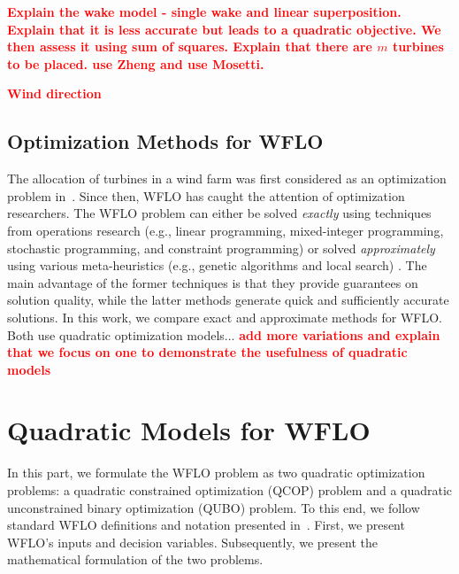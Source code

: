 \documentclass[preprint,12pt]{elsarticle}
\newcommand{\todo}[1]{{\textcolor{red}{\bf {#1}}}}
\begin{document}
\todo{Explain the wake model - single wake and linear superposition. Explain that it is less accurate but leads to a quadratic objective. We then assess it using sum of squares. Explain that there are $m$ turbines to be placed. use Zheng and use Mosetti.}

\todo{Wind direction}

 
\subsection{Optimization Methods for WFLO}

The allocation of turbines in a wind farm was first considered 
as an optimization problem in~\cite{MOSETTI1994105}. Since
then, WFLO has caught the attention of optimization researchers. 
The WFLO problem can either be solved \emph{exactly} using
techniques from operations research (e.g., linear programming, 
mixed-integer programming, stochastic programming, and constraint programming)\cite{Zhang2014,turner2014new}
or solved \emph{approximately} using various meta-heuristics (e.g., genetic algorithms and local search) \cite{MOSETTI1994105}.
The main advantage of the former techniques
is that they provide guarantees on solution quality, 
while the latter methods generate 
quick and sufficiently accurate solutions. In this work, we compare 
exact and approximate methods for WFLO. Both use 
quadratic optimization models... \todo{add more variations and explain that we
	focus on one to demonstrate the usefulness of quadratic models}


\section{Quadratic Models for WFLO}
\label{sec:QUBO4WFLO}

In this part, 
we formulate the WFLO problem
as two quadratic optimization problems: a
quadratic constrained optimization (QCOP) problem and 
a quadratic unconstrained binary optimization (QUBO) problem. 
To this end,
we follow standard WFLO definitions
and notation presented in~\cite{Zhang2014}. First, we present WFLO's inputs and decision variables.
Subsequently, we present the mathematical formulation of the two problems. 
\end{document}
